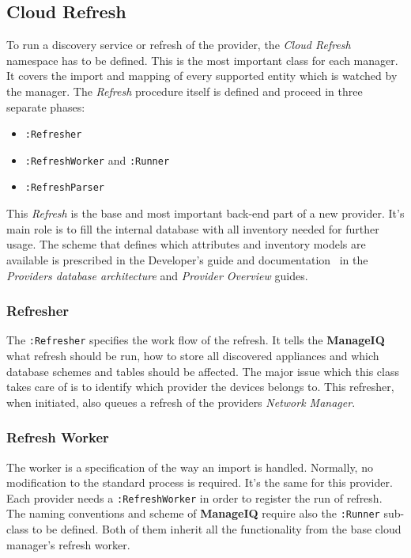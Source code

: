 \clearpage
\subsection{Cloud Refresh}
\label{sub:Cloud Refresh}

To run a discovery service or refresh of the provider, the \emph{Cloud Refresh} namespace has to be defined. This is the most important class for each manager. It covers the import and mapping of every supported entity which is watched by the manager. The \emph{Refresh} procedure itself is defined and proceed in three separate phases:

\begin{itemize}
	\item \verb|:Refresher|
	\item \verb|:RefreshWorker| and \verb|:Runner|
	\item \verb|:RefreshParser|
\end{itemize}

This \emph{Refresh} is the base and most important back-end part of a new provider. It's main role is to fill the internal database with all inventory needed for further usage. The scheme that defines which attributes and inventory models are available is prescribed in the Developer's guide and documentation~\cite{manageiq_dev} in the \emph{Providers database architecture} and \emph{Provider Overview} guides.

\subsubsection{Refresher}
\label{subs:Refresher}

The \verb|:Refresher| specifies the work flow of the refresh. It tells the \textbf{ManageIQ} what refresh should be run, how to store all discovered appliances and which database schemes and tables should be affected. The major issue which this class takes care of is to identify which provider the devices belongs to. This refresher, when initiated, also queues a refresh of the providers \emph{Network Manager}.

\subsubsection{Refresh Worker}
\label{subs:Refresh Worker}

The worker is a specification of the way an import is handled. Normally, no modification to the standard process is required. It's the same for this provider. Each provider needs a \verb|:RefreshWorker| in order to register the run of refresh. The naming conventions and scheme of \textbf{ManageIQ} require also the \verb|:Runner| sub-class to be defined. Both of them inherit all the functionality from the base cloud manager's refresh worker.

